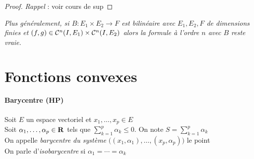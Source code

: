      \medskip
    
    
    \begin{proof} 
    \emph{Rappel} : voir cours de sup 
    \end{proof} \medskip
    
    \emph{Plus généralement, si $B : E_1\times E_2 \rightarrow F$ est bilinéaire avec $E_1,E_2,F$ de dimensions finies et $(f,g) \in {\mathcal{C}}^n(I,E_1)\times{\mathcal{C}}^n(I,E_2)$ alors la formule à l'ordre $n$ avec $B$ reste vraie.} \\
    
    
     \medskip
    
    
\section{Fonctions convexes}
    
    \vspace{-15pt}
    \traitd
    \paragraph{Barycentre (HP)}
        Soit $E$ un espace vectoriel et $x_1,\dots ,x_p \in E$ \\
        Soit $\alpha_1 ,\dots ,\alpha_p\in {\mathbf{R}}$ tels que $\sum_{k=1}^p \alpha_k \leqslant 0$. On note $S = \sum_{k=1}^p \alpha_k$\\
        On appelle \emph{barycentre du système} $\big( (x_1,\alpha_1) ,\dots ,(x_p,\alpha_p) \big)$ le point \\
        On parle d'\emph{isobarycentre} si $\alpha_1 = \cdots = \alpha_k$ 
	\trait 
	
